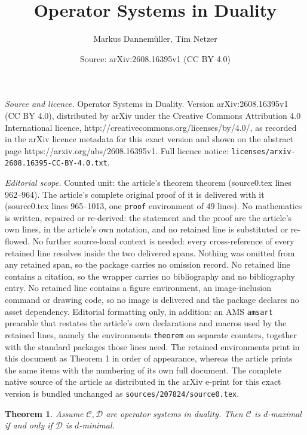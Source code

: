 \documentclass[10pt,a4paper]{amsart}
\title{Operator Systems in Duality}
\author{Markus Dannem\"uller, Tim Netzer}
\date{Source: arXiv:2608.16395v1 (CC BY 4.0)}
\newtheorem{theorem}{Theorem}
\begin{document}
\maketitle

\noindent\emph{Source and licence.} Operator Systems in Duality. Version arXiv:2608.16395v1 (CC BY 4.0), distributed by arXiv under the Creative Commons Attribution 4.0 International licence, http://creativecommons.org/licenses/by/4.0/, as recorded in the arXiv licence metadata for this exact version and shown on the abstract page https://arxiv.org/abs/2608.16395v1. Full licence notice: \texttt{licenses/arxiv-2608.16395-CC-BY-4.0.txt}.\par\smallskip

\noindent\textit{Editorial scope.} Counted unit: the article's theorem theorem (source0.tex lines 962--964). The article's complete original proof of it is delivered with it (source0.tex lines 965--1013, one \texttt{proof} environment of 49 lines). No mathematics is written, repaired or re-derived: the statement and the proof are the article's own lines, in the article's own notation, and no retained line is substituted or re-flowed.  No further source-local context is needed: every cross-reference of every retained line resolves inside the two delivered spans.  Nothing was omitted from any retained span, so the package carries no omission record.  No retained line contains a citation, so the wrapper carries no bibliography and no bibliography entry.  No retained line contains a figure environment, an image-inclusion command or drawing code, so no image is delivered and the package declares no asset dependency.  Editorial formatting only, in addition: an AMS \texttt{amsart} preamble that restates the article's own declarations and macros used by the retained lines, namely the environments \texttt{theorem} on separate counters, together with the standard packages those lines need.  The retained environments print in this document as Theorem 1 in order of appearance, whereas the article prints the same items with the numbering of its own full document.  The complete native source of the article as distributed in the arXiv e-print for this exact version is bundled unchanged as \texttt{sources/207824/source0.tex}.
\begin{theorem}
    Assume $\mathcal C,\mathcal D$ are operator systems in duality. Then $\mathcal C$ is $d$-maximal if and only if $\mathcal D$ is $d$-minimal.
\end{theorem}
\end{document}
